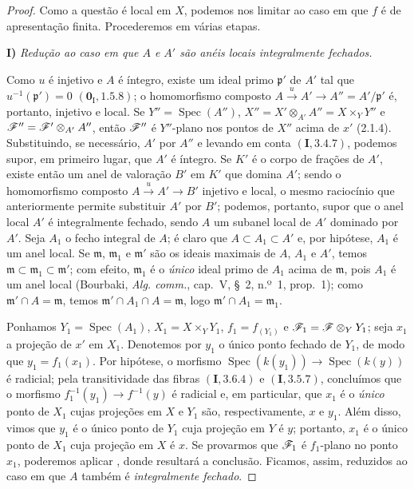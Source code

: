 \begin{proof}
Como a questão é local em
$X$, podemos nos limitar
ao caso em que $f$ é de
apresentação finita.
Procederemos em várias
etapas.

\medskip
\noindent\textbf{I)}
\emph{Redução ao caso em que
$A$ e $A'$ são anéis locais
integralmente fechados.}

Como $u$ é injetivo e $A$
é íntegro, existe um ideal
primo $\mathfrak p'$ de
$A'$ tal que
$u^{-1}(\mathfrak p')=0$
$(\mathbf{0}_{\mathrm I},
1.5.8)$; o homomorfismo
composto
$A\xrightarrow{u}A'\to
A''=A'/\mathfrak p'$ é,
portanto, injetivo e local.
Se $Y''=\operatorname{Spec}(A'')$,
$X''=X'\otimes_{A'}A''=
X\times_Y Y''$ e
$\mathscr{F}''=\mathscr{F}'\otimes_{A'}
A''$, então $\mathscr{F}''$
é $Y''$-plano nos pontos
de $X''$ acima de $x'$
(2.1.4). Substituindo,
se necessário, $A'$ por
$A''$ e levando em conta
$(\mathbf I,3.4.7)$,
podemos supor, em primeiro
lugar, que $A'$ é íntegro.
Se $K'$ é o corpo de frações
de $A'$, existe então um anel
de valoração $B'$ em $K'$
que domina $A'$; sendo o
homomorfismo composto
$A\xrightarrow{u}A'\to B'$
injetivo e local, o mesmo
raciocínio que
anteriormente permite substituir
$A'$ por $B'$; podemos,
portanto, supor que o anel
local $A'$ é integralmente
fechado, sendo $A$ um subanel
local de $A'$ dominado por
$A'$. Seja $A_1$ o fecho
integral de $A$; é claro que
$A\subset A_1\subset A'$ e,
por hipótese, $A_1$ é um
anel local. Se $\mathfrak m$,
$\mathfrak m_1$ e $\mathfrak m'$
são os ideais maximais de
$A$, $A_1$ e $A'$, temos
$\mathfrak m\subset\mathfrak m_1
\subset\mathfrak m'$; com efeito,
$\mathfrak m_1$ é o \emph{único}
ideal primo de $A_1$ acima
de $\mathfrak m$, pois $A_1$
é um anel local (Bourbaki,
\emph{Alg. comm.}, cap.~V,
\S~2, n.º~1, prop.~1); como
$\mathfrak m'\cap A=\mathfrak m$,
temos $\mathfrak m'\cap A_1
\cap A=\mathfrak m$, logo
$\mathfrak m'\cap A_1
=\mathfrak m_1$.

Ponhamos $Y_1=\operatorname{Spec}(A_1)$,
$X_1=X\times_Y Y_1$,
$f_1=f_{(Y_1)}$ e
$\mathscr{F}_1=\mathscr{F}\otimes_Y Y_1$;
seja $x_1$ a projeção de $x'$
em $X_1$. Denotemos por $y_1$
o único ponto fechado de $Y_1$,
de modo que $y_1=f_1(x_1)$.
Por hipótese, o morfismo
$\operatorname{Spec}(k(y_1))
\to\operatorname{Spec}(k(y))$
é radicial; pela transitividade
das fibras $(\mathbf I,3.6.4)$
e $(\mathbf I,3.5.7)$, concluímos
que o morfismo
$f_1^{-1}(y_1)\to f^{-1}(y)$
é radicial e, em particular,
que $x_1$ é o \emph{único}
ponto de $X_1$ cujas projeções
em $X$ e $Y_1$ são,
respectivamente, $x$ e $y_1$.
Além disso, vimos que $y_1$
é o único ponto de $Y_1$ cuja
projeção em $Y$ é $y$; portanto,
$x_1$ é o único ponto de $X_1$
cuja projeção em $X$ é $x$.
Se provarmos que $\mathscr{F}_1$
é $f_1$-plano no ponto $x_1$,
poderemos aplicar
, donde resultará
a conclusão. Ficamos, assim,
reduzidos ao caso em que $A$
também é \emph{integralmente
fechado}.


\end{proof}
